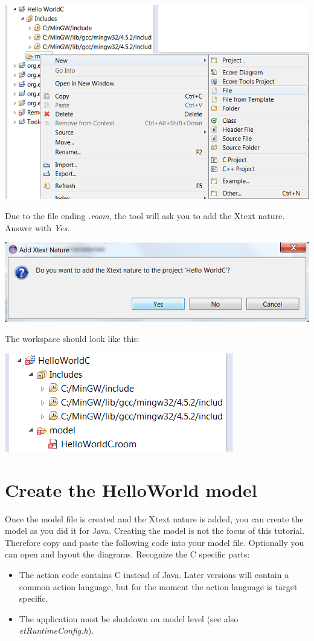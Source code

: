 \includegraphics{images/034-HelloWorldC03.png}

Due to the file ending \textit{.room}, the tool will ask you to add the Xtext nature. Answer with 
\textit{Yes}. 

\includegraphics{images/034-HelloWorldC04.png}

The workspace should look like this:

\includegraphics{images/034-HelloWorldC05.png}



\section{Create the HelloWorld model}

Once the model file is created and the Xtext nature is added, you can create the model as you did it for 
Java.
Creating the model is not the focus of this tutorial. Therefore copy and paste the following code into 
your model file. Optionally you can open and layout the diagrams.  
Recognize the C specific parts:
\begin{itemize}
\item The action code contains C instead of Java. Later versions will contain a common action language, 
but for the moment the action language is target specific.
\item The application must be shutdown on model level (see also \textit{etRuntimeConfig.h}).  
\end{itemize}

